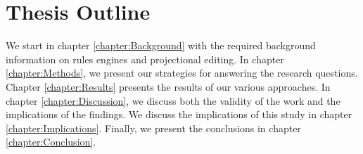 \section{Thesis Outline}

We start in chapter \ref{chapter:Background} with the required background information on rules engines and projectional editing.
In chapter \ref{chapter:Methods}, we present our strategies for answering the research questions.
Chapter \ref{chapter:Results} presents the results of our various approaches.
In chapter \ref{chapter:Discussion}, we discuss both the validity of the work and the implications of the findings.
We discuss the implications of this study in chapter \ref{chapter:Implications}.
Finally, we present the conclusions in chapter \ref{chapter:Conclusion}.
